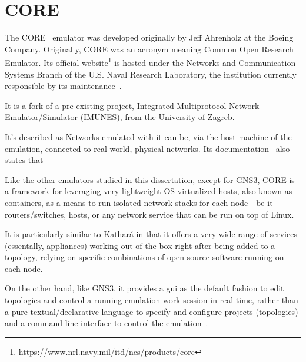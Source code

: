\section{CORE}
\label{sec:exemulcore}

The CORE~\cite{coreemulator} emulator was developed originally by Jeff Ahrenholz at the Boeing Company.
Originally, CORE was an acronym meaning Common Open Research Emulator.
Its official website\footnote{\url{https://www.nrl.navy.mil/itd/ncs/products/core}} is hosted under the Networks and Communication Systems Branch of the U.S. Naval Research Laboratory, the institution currently responsible by its maintenance~\cite{Peach2016AnOO}.

It is a fork of a pre-existing project, Integrated Multiprotocol Network Emulator/Simulator (IMUNES), from the University of Zagreb.

It's described as 
Networks emulated with it can be, via the host machine of the emulation, connected to real world, physical networks.
Its documentation~\cite{coreghdocs} also states that 

Like the other emulators studied in this dissertation, except for GNS3, CORE is a framework for leveraging very lightweight OS-virtualized hosts, also known as containers, as a means to run isolated network stacks for each node---be it routers/switches, hosts, or any network service that can be run on top of Linux.

It is particularly similar to Kathará in that it offers a very wide range of services (essentally, appliances) working out of the box right after being added to a topology, relying on specific combinations of open-source software running on each node.

On the other hand, like GNS3, it provides a \gls{gui} as the default fashion to edit topologies and control a running emulation work session in real time, rather than a pure textual/declarative language to specify and configure projects (topologies) and a command-line interface to control the emulation~\cite{coreghdocs}.


